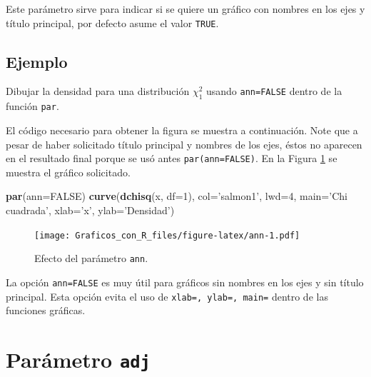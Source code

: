 \documentclass[10pt,]{krantz}
\makeatletter
\newenvironment{Shaded}{\begin{snugshade}}{\end{snugshade}}
\newcommand{\KeywordTok}[1]{\textcolor[rgb]{0.13,0.29,0.53}{\textbf{{#1}}}}
\newcommand{\DataTypeTok}[1]{\textcolor[rgb]{0.13,0.29,0.53}{{#1}}}
\newcommand{\DecValTok}[1]{\textcolor[rgb]{0.00,0.00,0.81}{{#1}}}
\newcommand{\StringTok}[1]{\textcolor[rgb]{0.31,0.60,0.02}{{#1}}}
\newcommand{\OtherTok}[1]{\textcolor[rgb]{0.56,0.35,0.01}{{#1}}}
\newcommand{\NormalTok}[1]{{#1}}
\newenvironment{kframe}{%
\medskip{}
\setlength{\fboxsep}{.8em}
 \def\at@end@of@kframe{}%
 \ifinner\ifhmode%
  \def\at@end@of@kframe{\end{minipage}}%
  \begin{minipage}{\columnwidth}%
 \fi\fi%
 \def\FrameCommand##1{\hskip\@totalleftmargin \hskip-\fboxsep
 \colorbox{shadecolor}{##1}\hskip-\fboxsep
     \hskip-\linewidth \hskip-\@totalleftmargin \hskip\columnwidth}%
 \MakeFramed {\advance\hsize-\width
   \@totalleftmargin\z@ \linewidth\hsize
   \@setminipage}}%
 {\par\unskip\endMakeFramed%
 \at@end@of@kframe}
\renewenvironment{Shaded}{\begin{kframe}}{\end{kframe}}
\let\BeginKnitrBlock\begin \let\EndKnitrBlock\end
\makeatother
\begin{document}
Este parámetro sirve para indicar si se quiere un gráfico con nombres en
los ejes y título principal, por defecto asume el valor \texttt{TRUE}.

\subsection*{Ejemplo}\label{ejemplo-24}


Dibujar la densidad para una distribución \(\chi^2_1\) usando
\texttt{ann=FALSE} dentro de la función \texttt{par}.

El código necesario para obtener la figura se muestra a continuación.
Note que a pesar de haber solicitado título principal y nombres de los
ejes, éstos no aparecen en el resultado final porque se usó antes
\texttt{par(ann=FALSE)}. En la Figura \ref{fig:ann} se muestra el
gráfico solicitado.

\begin{Shaded}
\begin{Highlighting}[]
\KeywordTok{par}\NormalTok{(}\DataTypeTok{ann=}\OtherTok{FALSE}\NormalTok{)}
\KeywordTok{curve}\NormalTok{(}\KeywordTok{dchisq}\NormalTok{(x, }\DataTypeTok{df=}\DecValTok{1}\NormalTok{), }\DataTypeTok{col=}\StringTok{'salmon1'}\NormalTok{, }\DataTypeTok{lwd=}\DecValTok{4}\NormalTok{,}
      \DataTypeTok{main=}\StringTok{'Chi cuadrada'}\NormalTok{,}
      \DataTypeTok{xlab=}\StringTok{'x'}\NormalTok{, }\DataTypeTok{ylab=}\StringTok{'Densidad'}\NormalTok{)}
\end{Highlighting}
\end{Shaded}

\begin{figure}[htbp]
\centering
\texttt{[image: Graficos\_con\_R\_files/figure-latex/ann-1.pdf]}
\caption{\label{fig:ann}Efecto del parámetro \texttt{ann}.}
\end{figure}

\BeginKnitrBlock{rmdnote}
La opción \texttt{ann=FALSE} es muy útil para gráficos sin nombres en
los ejes y sin título principal. Esta opción evita el uso de
\texttt{xlab=\textquotesingle{}\textquotesingle{},\ ylab=\textquotesingle{}\textquotesingle{},\ main=\textquotesingle{}\textquotesingle{}}
dentro de las funciones gráficas.
\EndKnitrBlock{rmdnote}

\section{\texorpdfstring{Parámetro \texttt{adj}
}{Parámetro adj  }}\label{parametro-adj}
\end{document}
